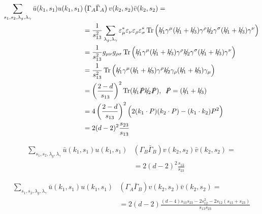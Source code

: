 \begin{equation}
    \begin{split}
        \sum_{s_1,s_2,\lambda_g,\lambda_\gamma} \bar u(k_1,s_1) u(k_1,s_1)&\left(\Gamma_A \bar\Gamma_A\right)v(k_2,s_2)\bar v(k_2,s_2) = \\
                                                                        &=\frac1{s_{13}^2}\sum_{\lambda_g,\lambda_\gamma}\varepsilon_\mu^*\varepsilon_\nu\varepsilon_\rho\varepsilon_\sigma^*\operatorname{Tr}\Big(\slashed{k_1}\gamma^\mu(\slashed{k_1}+\slashed{k_3})\gamma^\rho\slashed{k_2}\gamma^\sigma(\slashed{k_1}+\slashed{k_3})\gamma^\nu\Big)\\
                                                                        &=\frac1{s_{13}^2}g_{\mu\nu}g_{\rho\sigma}\operatorname{Tr}\Big(\slashed{k_1}\gamma^\mu(\slashed{k_1}+\slashed{k_3})\gamma^\rho\slashed{k_2}\gamma^\sigma(\slashed{k_1}+\slashed{k_3})\gamma^\nu\Big)\\
                                                                        &=\frac1{s_{13}^2}\operatorname{Tr}\Big(\slashed{k_1}\gamma^\mu(\slashed{k_1}+\slashed{k_3})\gamma^\rho\slashed{k_2}\gamma_\rho(\slashed{k_1}+\slashed{k_3})\gamma_\mu\Big)\\
                                                                        &=\left(\frac{2-d}{s_{13}}\right)^2\operatorname{Tr}(\slashed{k_1}\slashed{P}\slashed{k_2}\slashed{P}),\,\,\,\slashed{P} = (\slashed{k_1}+\slashed{k_3})\\
                                                                        &=4\left(\frac{2-d}{s_{13}}\right)^2\Big(2(k_1\cdot P)(k_2\cdot P)-(k_1\cdot k_2)P^2\Big)\\
                                                                        &=2(d-2)^2\frac{s_{23}}{s_{13}}
    \end{split}
\end{equation}

\begin{equation}
    \begin{split}
        \sum_{s_1,s_2,\lambda_g,\lambda_\gamma} \bar u(k_1,s_1) u(k_1,s_1)&\left(\Gamma_B \bar\Gamma_B\right)v(k_2,s_2)\bar v(k_2,s_2) = \\
                                                                        &=2(d-2)^2\frac{s_{13}}{s_{23}}
    \end{split}
\end{equation}

\begin{equation}
    \begin{split}
        \sum_{s_1,s_2,\lambda_g,\lambda_\gamma} \bar u(k_1,s_1) u(k_1,s_1)&\left(\Gamma_A \bar\Gamma_B\right)v(k_2,s_2)\bar v(k_2,s_2) = \\
                                                                        &=2(d-2)\frac{(d-4)s_{13}s_{23}-2s_{12}^2-2s_{12}(s_{13}+s_{23})}{s_{13}s_{23}}
    \end{split}
\end{equation}

